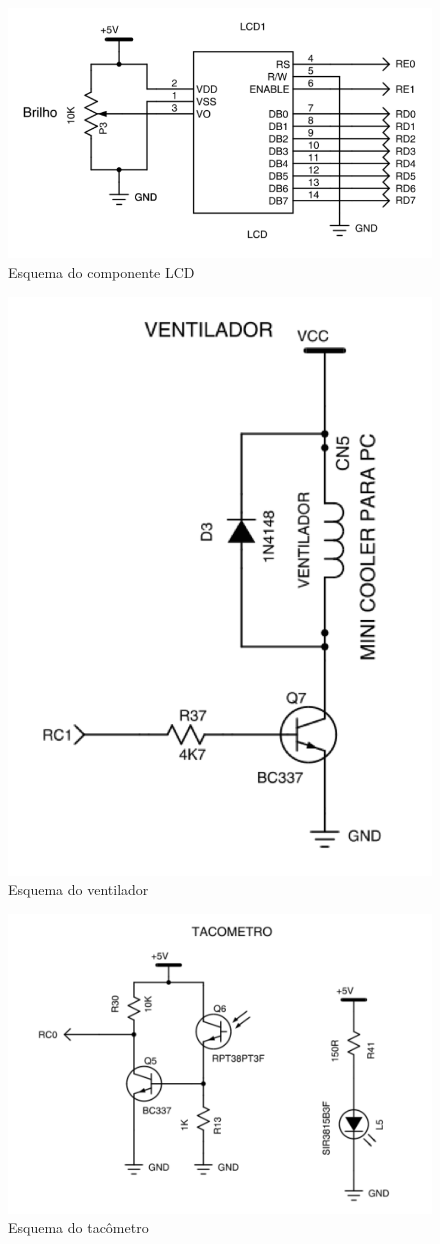\documentclass{article}
\begin{document}
\begin{figure}[H]
	\centering
	\includegraphics[width=0.9\linewidth]{esq_lcd}
	\caption{Esquema do componente LCD}
	\label{fig:esq_lcd}
\end{figure}
\begin{figure}[H]
	\centering
	\includegraphics[width=0.5\linewidth]{esq_cooler}
	\caption{Esquema do ventilador}
	\label{fig:esq_cooler}
\end{figure}
\begin{figure}[H]
	\centering
	\includegraphics[width=0.9\linewidth]{esq_sensor}
	\caption{Esquema do tacômetro}
	\label{fig:esq_sensor}
\end{figure}
\end{document}
